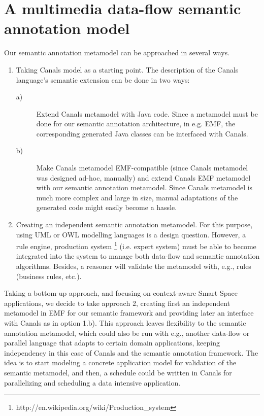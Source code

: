 \documentclass[[10pt,abbrv]{llncs}
\begin{document}
\section{A multimedia data-flow semantic annotation model}
Our semantic annotation metamodel can be approached in several ways.
\begin{enumerate}
  \item Taking Canals model as a starting point. The description of the Canals language's semantic extension can be done in two ways:
\begin{description}
  \item[a)] Extend Canals metamodel with Java code. Since a metamodel must be done for our semantic annotation architecture, in e.g. EMF, the corresponding generated Java classes can be interfaced with Canals.
  \item[b)] Make Canals metamodel EMF-compatible (since Canals metamodel was designed ad-hoc, manually) and extend Canals EMF metamodel with our semantic annotation metamodel. Since Canals metamodel is much more complex and large in size, manual adaptations of the generated code might easily become a hassle.
\end{description}
 \item Creating an independent semantic annotation metamodel. For this purpose, using UML or OWL modelling languages is a design question. However, a rule engine, production system \footnote{http://en.wikipedia.org/wiki/Production\_system} (i.e. expert system) must be able to become integrated into the system to manage both data-flow and semantic annotation algorithms. Besides, a reasoner will validate the metamodel with, e.g., rules (business rules, etc.).
\end{enumerate}

Taking a bottom-up approach, and focusing on context-aware Smart Space applications, we decide to take approach 2, creating first an independent metamodel in EMF for our semantic framework and providing later an interface with Canals as in option 1.b). This approach leaves flexibility to the semantic annotation metamodel, which could also be run with e.g., another data-flow or parallel language that adapts to certain domain applications, keeping independency in this case of Canals and the semantic annotation framework.
The idea is to start modeling a concrete application model for validation of the semantic metamodel, and then, a schedule could be written in Canals for parallelizing and scheduling a data intensive application.
\end{document}
